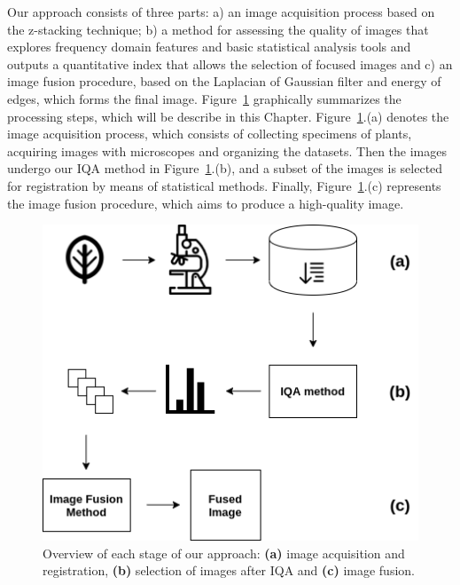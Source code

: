 Our approach consists of three parts: a) an image acquisition process based on the z-stacking technique; b) a method for assessing the quality of images that explores frequency domain features and basic statistical analysis tools and outputs a quantitative index that allows the selection of focused images and c) an image fusion procedure, based on the Laplacian of Gaussian filter and energy of edges, which forms the final image. Figure~\ref{fig:overview} graphically summarizes the processing steps, which will be describe in this Chapter. Figure~\ref{fig:overview}.(a) denotes the image acquisition process, which consists of collecting specimens of plants, acquiring images with microscopes and organizing the datasets. Then the images undergo our IQA method in Figure~\ref{fig:overview}.(b), and a subset of the images is selected for registration by means of statistical methods. Finally, Figure~\ref{fig:overview}.(c) represents the image fusion procedure, which aims to produce a high-quality image.

\begin{figure}[ht]
  \centering
  \caption{Overview of each stage of our approach: \textbf{(a)} image acquisition and registration, \textbf{(b)} selection of images after IQA and \textbf{(c)} image fusion.}
  \label{fig:overview}
  \includegraphics[scale=0.8]{images/overview.png}
  \centering
  \fautor
\end{figure}